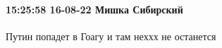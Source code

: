  
 
 
 
 


\paragraph{15:25:58 16-08-22 Мишка Сибирский}

Путин попадет в Гоагу и там неххх не останется
